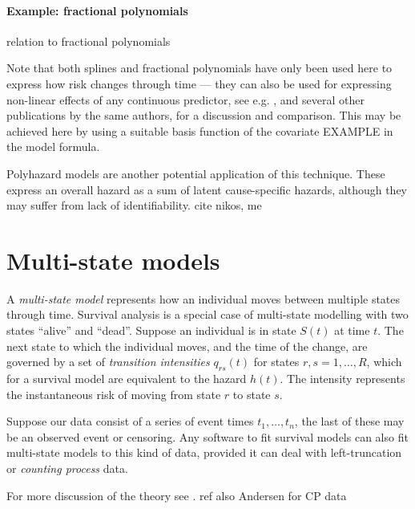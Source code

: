 \documentclass[nojss,nofooter]{jss}
\begin{document}
\paragraph{Example: fractional polynomials}


relation to fractional polynomials \citep{royston1994regression}

Note that both splines and fractional polynomials have only been used
here to express how risk changes through time --- they can also be
used for expressing non-linear effects of any continuous predictor,
see e.g. \citet{sauerbrei2007selection}, and several other
publications by the same authors, for a discussion and comparison.
This may be achieved here by using a suitable basis function of the
covariate EXAMPLE in the model formula.

Polyhazard models \citep{polyhazard} are another potential application
of this technique.  These express an overall hazard as a sum of latent
cause-specific hazards, although they may suffer from lack of
identifiability.  cite nikos, me

\section{Multi-state models}

A \emph{multi-state model} represents how an individual moves between
multiple states through time.  Survival analysis is a special case of
multi-state modelling with two states ``alive'' and ``dead''. Suppose
an individual is in state $S(t)$ at time $t$.  The next state to which
the individual moves, and the time of the change, are governed by a
set of \emph{transition intensities} $q_{rs}(t)$ for states $r, s =
1,\dots,R$, which for a survival model are equivalent to the hazard
$h(t)$.  The intensity represents the instantaneous risk of moving
from state $r$ to state $s$.

Suppose our data consist of a series of event times $t_{1},\dots,
t_{n}$, the last of these may be an observed event or censoring.  Any
software to fit survival models can also fit multi-state models to
this kind of data, provided it can deal with left-truncation or
\emph{counting process} data.

For more discussion of the theory see \citet{putter:mstate}. ref also
Andersen for CP data
\end{document}
